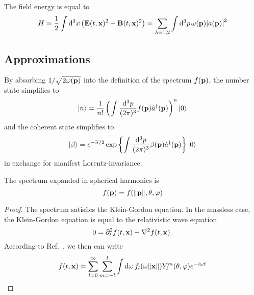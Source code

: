\begin{lemma}\label{thm:mw_energy}
	The field energy is equal to
	\begin{equation}
		H
		=
		\frac{1}{2}
		\int\dd[3]{x}
		\left(
			\vb{E}(t,\vb{x})^2
			+
			\vb{B}(t,\vb{x})^2
		\right)
		=
		\sum_{\lambda=1,2}
		\int\dd[3]{p}
		\omega(\vb{p})
		\abs{a(\vb{p})}^2
	\end{equation}
\end{lemma}

\subsection{Approximations}
 
\begin{lemma}
	By absorbing $1/\sqrt{2\omega(\vb{p})}$ into the definition of the spectrum $f(\vb{p})$, the number state simplifies to
	\begin{equation}
		\ket{n}
		=
		\frac{1}{n!}
		\left(
			\int\frac{\dd[3]{p}}{(2\pi)^3}
			f(\vb{p})
			\hat{a}^\dagger(\vb{p})
		\right)^n
		\ket{0}
	\end{equation}
	and the coherent state simplifies to
	\begin{equation}
		\ket{\beta}
		=
		e^{-\overline{n}/2}
		\exp\left\{
			\int\frac{\dd[3]{p}}{(2\pi)^3}
			\beta(\vb{p})
			\hat{a}^\dagger(\vb{p})
		\right\}
		\ket{0}
	\end{equation}
	in exchange for manifest Lorentz-invariance.
\end{lemma}
\begin{theorem}
	The spectrum expanded in spherical harmonics is
	\begin{equation}
		f(\vb{p})
		=
		f(\norm{\vb{p}},\theta,\varphi)
	\end{equation}
\end{theorem}
\begin{proof}
	The spectrum satisfies the Klein-Gordon equation.
	In the massless case, the Klein-Gordon equation is equal to the relativistic wave equation
	\begin{equation}
		0
		=
		\partial_t^2
		f(t,\vb{x})
		-
		\laplacian
		f(t,\vb{x})
		.
	\end{equation}
	According to Ref.~\cite[p.~538]{Jackson2007}, we then can write
	\begin{equation}
		f(t,\vb{x})
		=
		\sum_{l=0}^\infty
		\sum_{m=-l}^l
		\int\dd{\omega}
		f_l(\omega\norm{\vb{x}})
		Y_l^m(\theta,\varphi)
		e^{-i\omega t}
	\end{equation}
\end{proof}

